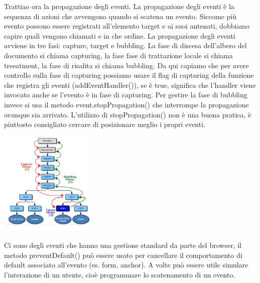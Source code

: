\newline
Trattiao ora la propagazione degli eventi.\newline
La propagazione degli eventi è la sequenza di azioni che avvengono quando si scatena un evento. Siccome più evento possono essere registrati all'elemento target e ai suoi antenati, dobbiamo capire quali vengono chiamati e in che ordine.\newline
La propagazione degli eventi avviene in tre fasi: capture, target e bubbling.\newline
La fase di discesa dell'albero del documento si chiama capturing, la fase fase di trattazione locale si chiama treeatment, la fase di risalita si chiama bubbling.\newline
Da qui capiamo che per avere controllo sulla fase di capturing possiamo usare il flag di capturing della funzione che registra gli eventi (addEventHandler()), se è true, significa che l'handler viene invocato anche se l'evento è in fase di capturing.\newline
Per gestire la fase di bubbling invece si usa il metodo event.stopPropagation() che interrompe la propagazione ovunque sia arrivato. L'utilizzo di stopPropagation() non è una buona pratica, è piuttosto consigliato cercare di posizionare meglio i propri eventi.
\begin{center}
    \includegraphics[height=5cm]{../lezione17/img1.PNG}
\end{center}
Ci sono degli eventi che hanno una gestione standard da parte del browser, il metodo preventDefault() può essere usato per cancellare il comportamento di default associato all'evento (es. form, anchor).\newline
A volte può essere utile simulare l'interazione di un utente, cioè programmare lo scatenamento di un evento.